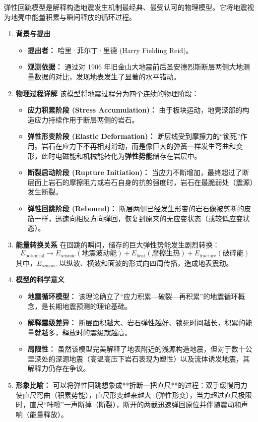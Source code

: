 \documentclass[12pt,a4paper]{article}
\begin{document}
	弹性回跳模型是解释构造地震发生机制最经典、最受认可的物理模型。它将地震视为地壳中能量积累与瞬间释放的循环过程。
	
	\begin{enumerate}
		\item \textbf{背景与提出}
		\begin{itemize}
			\item \textbf{提出者：} 哈里·菲尔丁·里德 (Harry Fielding Reid)。
			\item \textbf{观测依据：} 通过对 1906 年旧金山大地震前后圣安德烈斯断层两侧大地测量数据的对比，发现地表发生了显著的水平错动。
		\end{itemize}
		
		\item \textbf{物理过程详解}
		该模型将地震过程分为四个连续的物理阶段：
		\begin{itemize}
			\item \textbf{应力积累阶段 (Stress Accumulation)：} 由于板块运动，地壳深部的构造应力持续作用于断层两侧的岩石。
			\item \textbf{弹性形变阶段 (Elastic Deformation)：} 断层线受到摩擦力的“锁死”作用。岩石在应力下不再相对滑动，而是像巨大的弹簧一样发生弯曲和变形，此时电磁能和机械能转化为\textbf{弹性势能}储存在岩层中。
			\item \textbf{断裂启动阶段 (Rupture Initiation)：} 当应力不断增加，最终超过了断层面上岩石的摩擦阻力或岩石自身的抗剪强度时，岩石在最脆弱处（震源）发生断裂。
			\item \textbf{弹性回跳阶段 (Rebound)：} 断层两侧已经发生形变的岩石像被剪断的皮筋一样，迅速向相反方向弹回，恢复到原来的无应变状态（或较低应变状态）。
		\end{itemize}
		
		\item \textbf{能量转换关系}
		在回跳的瞬间，储存的巨大弹性势能发生剧烈转换：
		\begin{equation}
			E_{\text{potential}} \rightarrow E_{\text{seismic}} (\text{地震波动能}) + E_{\text{heat}} (\text{摩擦生热}) + E_{\text{fracture}} (\text{破碎能})
		\end{equation}
		其中，$E_{\text{seismic}}$ 以纵波、横波和面波的形式向四周传播，造成地表震动。
		
		\item \textbf{模型的科学意义}
		\begin{itemize}
			\item \textbf{地震循环模型：} 该理论确立了“应力积累—破裂—再积累”的地震循环概念，是长期地震预测的理论基础。
			\item \textbf{解释震级差异：} 断层面积越大、岩石弹性越好、锁死时间越长，积累的能量就越多，释放时的震级就越高。
			\item \textbf{局限性：} 虽然该模型完美解释了地表附近的浅源构造地震，但对于数十公里深处的深源地震（高温高压下岩石表现为塑性）以及流体诱发地震，其解释力仍存在争议。
		\end{itemize}
		
		\item \textbf{形象比喻：}
		可以将弹性回跳想象成**折断一把直尺**的过程：双手缓慢用力使直尺弯曲（积累势能），直尺形变越来越大（弹性形变），当力超过直尺极限时，直尺“咔嚓”一声断掉（断裂），断开的两截迅速弹回原位并伴随震动和声响（能量释放）。
	\end{enumerate}
	
\end{document}
